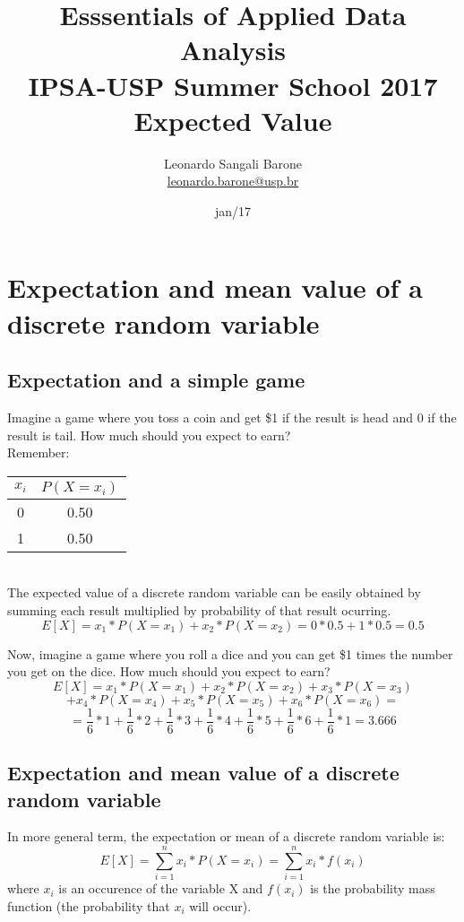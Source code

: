 \documentclass[11pt]{article}
\title{\textbf{Esssentials of Applied Data Analysis\\
				IPSA-USP Summer School 2017}\newline\\
				Expected Value}
\author{Leonardo Sangali Barone\\ \href{leonardo.barone@usp.br}{leonardo.barone@usp.br}}
\date{jan/17}
\begin{document}
\maketitle

\section*{Expectation and mean value of a discrete random variable}


	\subsection*{Expectation and a simple game}

	Imagine a game where you toss a coin and get \$1 if the result is head and 0 if the result is tail. How much should you expect to earn?\\

	Remember:
	
\begin{tabular}{|c|c|}
\hline
	$x_i$ & $P(X = x_i)$\\
\hline
	0 & 0.50\\
	1 & 0.50\\
\hline
\end{tabular}\\


	The expected value of a discrete random variable can be easily obtained by summing each result multiplied by probability of that result ocurring.
	\[E[X] = x_1 * P(X = x_1) + x_2 * P(X = x_2) = 0* 0.5 + 1 * 0.5 = 0.5\]
	


	Now, imagine a game where you roll a dice and you can get \$1 times the number you get on the dice. How much should you expect to earn?\\

\[ E[X] = x_1 * P(X = x_1) + x_2 * P(X = x_2) + x_3 * P(X = x_3) \]
\[+ x_4 * P(X = x_4) + x_5 * P(X = x_5) + x_6 * P(X = x_6) = \]
\[ = \frac{1}{6} * 1 + \frac{1}{6} * 2 + \frac{1}{6} * 3 + \frac{1}{6} * 4 + \frac{1}{6} * 5 + \frac{1}{6} * 6 + \frac{1}{6} * 1 = 3.666 \]

	\subsection*{Expectation and mean value of a discrete random variable}

	In more general term, the expectation or mean of a discrete random variable is:
	\[E[X] = \sum\limits_{i=1}^n x_i * P(X = x_i) = \sum\limits_{i=1}^n x_i * f(x_i)\]
where $x_i$ is an occurence of the variable X and $f(x_i)$ is the probability mass function (the probability that $x_i$ will occur).\\
\end{document}

